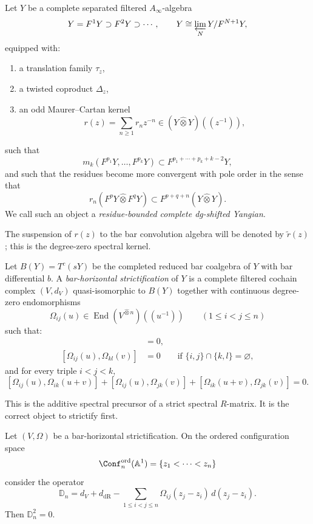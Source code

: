 \begin{definition}
Let $Y$ be a complete separated filtered $A_\infty$-algebra
\[
Y=F^1Y\supset F^2Y\supset \cdots,
\qquad
Y\cong \varprojlim_N Y/F^{N+1}Y,
\]
equipped with:
\begin{enumerate}
\item a translation family $\tau_z$,
\item a twisted coproduct $\Delta_z$,
\item an odd Maurer--Cartan kernel
\[
r(z)=\sum_{n\ge 1} r_n z^{-n} \in (Y\widehat\otimes Y)((z^{-1})),
\]
\end{enumerate}
such that
\[
m_k(F^{p_1}Y,\dots,F^{p_k}Y)
\subset F^{p_1+\cdots+p_k+k-2}Y,
\]
and such that the residues become more convergent with pole order in the
sense that
\[
r_n(F^pY\widehat\otimes F^qY)
\subset F^{p+q+n}(Y\widehat\otimes Y).
\]
We call such an object a \emph{residue-bounded complete dg-shifted
Yangian}.
\end{definition}

The suspension of $r(z)$ to the bar convolution algebra will be denoted
by $\widetilde r(z)$; this is the degree-zero spectral kernel.

\begin{definition}
Let $B(Y)=T^c(sY)$ be the completed reduced bar coalgebra of $Y$ with
bar differential $b$.  A \emph{bar-horizontal strictification} of $Y$
is a complete filtered cochain complex $(V,d_V)$ quasi-isomorphic to
$B(Y)$ together with continuous degree-zero endomorphisms
\[
\Omega_{ij}(u)\in \operatorname{End}(V^{\widehat\otimes n})((u^{-1}))
\qquad (1\le i<j\le n)
\]
such that:
\begin{align*}
[d_V,\Omega_{ij}(u)]&=0,\\
[\Omega_{ij}(u),\Omega_{kl}(v)]&=0
\qquad \text{if }\{i,j\}\cap\{k,l\}=\varnothing,
\end{align*}
and for every triple $i<j<k$,
\[
[\Omega_{ij}(u),\Omega_{ik}(u+v)]
+[\Omega_{ij}(u),\Omega_{jk}(v)]
+[\Omega_{ik}(u+v),\Omega_{jk}(v)] = 0.
\]
\end{definition}

This is the additive spectral precursor of a strict spectral
$R$-matrix.  It is the correct object to strictify first.

\begin{theorem}
\ClaimStatusProvedHere
\label{thm:derived-additive-kz}
Let $(V,\Omega)$ be a bar-horizontal strictification.  On the ordered
configuration space
\[
\Conf_n^{\mathrm{ord}}(\mathbb A^1)=\{z_1<\cdots<z_n\}
\]
consider the operator
\[
\mathbb D_n
=
 d_V+d_{\mathrm{dR}}
 - \sum_{1\le i<j\le n}\Omega_{ij}(z_j-z_i)\,d(z_j-z_i).
\]
Then $\mathbb D_n^2=0$.
\end{theorem}

